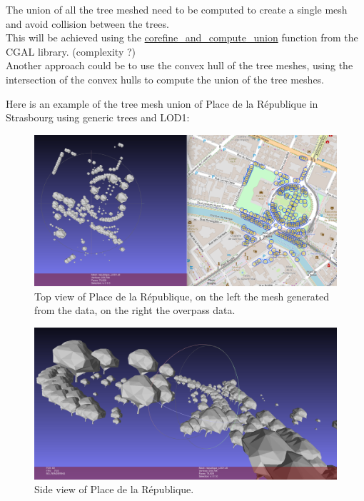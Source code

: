 \documentclass[12pt]{article}
\begin{document}
The union of all the tree meshed need to be computed to create a single mesh
and avoid collision between the trees. \\
This will be achieved using the \href{https://doc.cgal.org/latest/Polygon_mesh_processing/group__PMP__corefinement__grp.html}{corefine\_and\_compute\_union} function from the CGAL library.
(complexity ?) \\
Another approach could be to use the convex hull of the tree meshes, using the 
intersection of the convex hulls to compute the union of the tree meshes.

Here is an example of the tree mesh union of Place de la République in Strasbourg
using generic trees and LOD1:

\begin{figure}[H]
    \centering
        \centering
        \includegraphics[width=\textwidth]{images/mesh_vs_overpass.png}
        \caption{Top view of Place de la République, on the left the mesh generated from the data,
        on the right the overpass data.}

\end{figure}

\begin{figure}[H]
        \centering
        \includegraphics[width=\textwidth]{images/republic_side.png}
        \caption{Side view of Place de la République.}
\end{figure}
\end{document}
